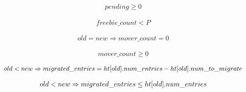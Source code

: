 \begin{lemma}
  \begin{equation*}
\begin{array}{l}        
  pending \geq 0
\end{array}
\end{equation*}  
  \label{pending_lb}
\end{lemma}  


\begin{lemma}
  \begin{equation*}
\begin{array}{l}        
  freebie\_count < P
\end{array}
  \end{equation*}  
  \label{did_not_pay_ub}    
\end{lemma}  

\begin{lemma}
  \begin{equation*}
\begin{array}{l}        
  old = new \Rightarrow mover\_count = 0
\end{array}
  \end{equation*} 
  \label{paid_tax0}    
\end{lemma}  

\begin{lemma}        
  \begin{equation*}
\begin{array}{l}
  mover\_count \geq 0
\end{array}
\end{equation*}
  \label{paid_tax1}  
\end{lemma}


\begin{lemma}
  \begin{equation*}
\begin{array}{l}        
  old < new \Rightarrow migrated\_entries = \mbox{$ht[old]$}.num\_entries - \mbox{$ht[old]$}.num\_to\_migrate
\end{array}
\end{equation*}  
  \label{revenue1}    
\end{lemma}

\begin{lemma}
  \begin{equation*}
\begin{array}{l}        
  old < new \Rightarrow migrated\_entries \leq \mbox{$ht[old]$}.num\_entries
\end{array}
\end{equation*}
  \label{revenue2}    
\end{lemma}

